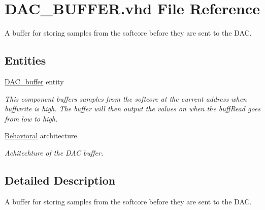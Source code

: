 \hypertarget{DAC__BUFFER_8vhd}{\section{D\-A\-C\-\_\-\-B\-U\-F\-F\-E\-R.\-vhd File Reference}
\label{DAC__BUFFER_8vhd}
}


A buffer for storing samples from the softcore before they are sent to the D\-A\-C.  


\subsection*{Entities}
\begin{DoxyCompactItemize}
\item 
\hyperlink{classDAC__buffer}{D\-A\-C\-\_\-buffer} entity
\begin{DoxyCompactList}\small\item\em This component buffers samples from the softcore at the current address when buffwrite is high. The buffer will then output the values on when the buff\-Read goes from low to high. \end{DoxyCompactList}\item 
\hyperlink{classDAC__buffer_1_1Behavioral}{Behavioral} architecture
\begin{DoxyCompactList}\small\item\em Achitechture of the D\-A\-C buffer. \end{DoxyCompactList}\end{DoxyCompactItemize}


\subsection{Detailed Description}
A buffer for storing samples from the softcore before they are sent to the D\-A\-C. 